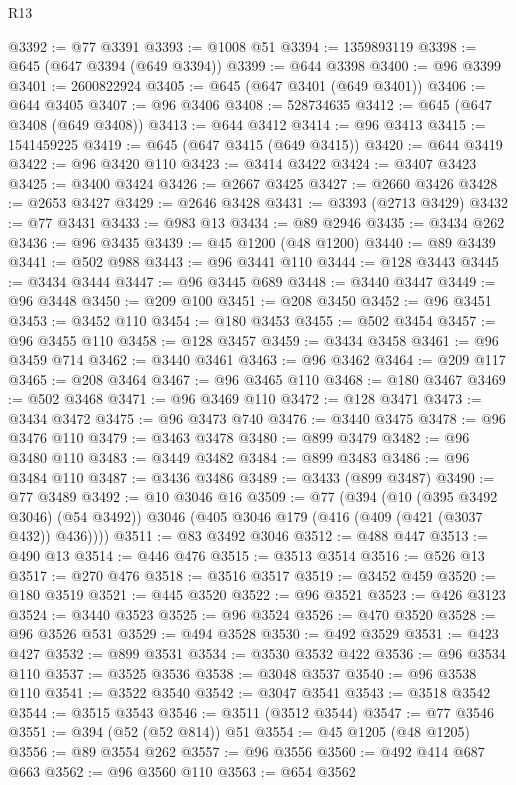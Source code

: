 \begin{lexlean}{R13}
\begin{coremodule}
@3392 := @77 @3391
@3393 := @1008 @51
@3394 := 1359893119
@3398 := @645 (@647 @3394 (@649 @3394))
@3399 := @644 @3398
@3400 := @96 @3399
@3401 := 2600822924
@3405 := @645 (@647 @3401 (@649 @3401))
@3406 := @644 @3405
@3407 := @96 @3406
@3408 := 528734635
@3412 := @645 (@647 @3408 (@649 @3408))
@3413 := @644 @3412
@3414 := @96 @3413
@3415 := 1541459225
@3419 := @645 (@647 @3415 (@649 @3415))
@3420 := @644 @3419
@3422 := @96 @3420 @110
@3423 := @3414 @3422
@3424 := @3407 @3423
@3425 := @3400 @3424
@3426 := @2667 @3425
@3427 := @2660 @3426
@3428 := @2653 @3427
@3429 := @2646 @3428
@3431 := @3393 (@2713 @3429)
@3432 := @77 @3431
@3433 := @983 @13
@3434 := @89 @2946
@3435 := @3434 @262
@3436 := @96 @3435
@3439 := @45 @1200 (@48 @1200)
@3440 := @89 @3439
@3441 := @502 @988
@3443 := @96 @3441 @110
@3444 := @128 @3443
@3445 := @3434 @3444
@3447 := @96 @3445 @689
@3448 := @3440 @3447
@3449 := @96 @3448
@3450 := @209 @100
@3451 := @208 @3450
@3452 := @96 @3451
@3453 := @3452 @110
@3454 := @180 @3453
@3455 := @502 @3454
@3457 := @96 @3455 @110
@3458 := @128 @3457
@3459 := @3434 @3458
@3461 := @96 @3459 @714
@3462 := @3440 @3461
@3463 := @96 @3462
@3464 := @209 @117
@3465 := @208 @3464
@3467 := @96 @3465 @110
@3468 := @180 @3467
@3469 := @502 @3468
@3471 := @96 @3469 @110
@3472 := @128 @3471
@3473 := @3434 @3472
@3475 := @96 @3473 @740
@3476 := @3440 @3475
@3478 := @96 @3476 @110
@3479 := @3463 @3478
@3480 := @899 @3479
@3482 := @96 @3480 @110
@3483 := @3449 @3482
@3484 := @899 @3483
@3486 := @96 @3484 @110
@3487 := @3436 @3486
@3489 := @3433 (@899 @3487)
@3490 := @77 @3489
@3492 := @10 @3046 @16
@3509 := @77
    (@394
      (@10 (@395 @3492 @3046) (@54 @3492))
      @3046
      (@405 @3046 @179 (@416 (@409 (@421 (@3037 @432)) @436))))
@3511 := @83 @3492 @3046
@3512 := @488 @447
@3513 := @490 @13
@3514 := @446 @476
@3515 := @3513 @3514
@3516 := @526 @13
@3517 := @270 @476
@3518 := @3516 @3517
@3519 := @3452 @459
@3520 := @180 @3519
@3521 := @445 @3520
@3522 := @96 @3521
@3523 := @426 @3123
@3524 := @3440 @3523
@3525 := @96 @3524
@3526 := @470 @3520
@3528 := @96 @3526 @531
@3529 := @494 @3528
@3530 := @492 @3529
@3531 := @423 @427
@3532 := @899 @3531
@3534 := @3530 @3532 @422
@3536 := @96 @3534 @110
@3537 := @3525 @3536
@3538 := @3048 @3537
@3540 := @96 @3538 @110
@3541 := @3522 @3540
@3542 := @3047 @3541
@3543 := @3518 @3542
@3544 := @3515 @3543
@3546 := @3511 (@3512 @3544)
@3547 := @77 @3546
@3551 := @394 (@52 (@52 @814)) @51
@3554 := @45 @1205 (@48 @1205)
@3556 := @89 @3554 @262
@3557 := @96 @3556
@3560 := @492 @414 @687 @663
@3562 := @96 @3560 @110
@3563 := @654 @3562

\end{coremodule}
\end{lexlean}
